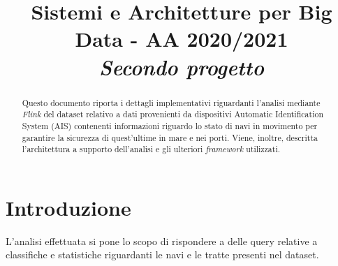\documentclass[conference]{IEEEtran}
\begin{document}
\title{Sistemi e Architetture per Big Data - AA 2020/2021 \\
	\LARGE \emph{Secondo progetto}}

\author{
\and
{}

}

\maketitle

\begin{abstract}
Questo documento riporta i dettagli implementativi
riguardanti l'analisi mediante \emph{Flink} del dataset relativo a dati provenienti da
dispositivi Automatic Identification System (AIS) contenenti informazioni riguardo lo stato di navi in movimento per garantire la sicurezza di quest'ultime in mare e nei porti. Viene, inoltre, descritta l'architettura
a supporto dell'analisi e gli ulteriori \emph{framework} utilizzati.
\end{abstract}

\section{\textbf{Introduzione}}
L'analisi effettuata si pone lo scopo di rispondere a delle
query relative a classifiche e statistiche riguardanti le navi e le tratte presenti nel dataset.\\
\end{document}
